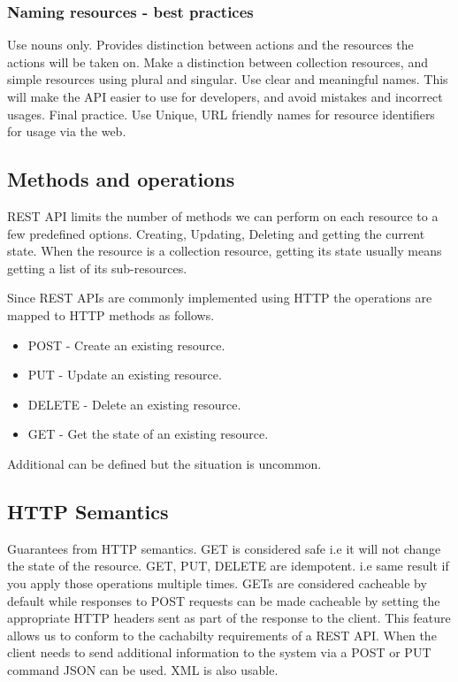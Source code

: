 \subsubsection{Naming resources - best practices}
Use nouns only.
Provides distinction between actions and the resources the actions will be taken on.
Make a distinction between collection resources, and simple resources using plural and singular.
Use clear and meaningful names.
This will make the API easier to use for developers, and avoid mistakes and incorrect usages.
Final practice.
Use Unique, URL friendly names for resource identifiers for usage via the web.

\subsection{Methods and operations}
REST API limits the number of methods we can perform on each resource to a few predefined options.
Creating, Updating, Deleting and getting the current state.
When the resource is a collection resource, getting its state usually means getting a list of its sub-resources.

Since REST APIs are commonly implemented using HTTP the operations are mapped to HTTP methods as follows.

\begin{itemize}
    \item POST - Create an existing resource.
    \item PUT - Update an existing resource.
    \item DELETE - Delete an existing resource.
    \item GET - Get the state of an existing resource.
\end{itemize}

Additional can be defined but the situation is uncommon.

\subsection{HTTP Semantics}
Guarantees from HTTP semantics.
GET is considered safe i.e it will not change the state of the resource.
GET, PUT, DELETE are idempotent.
i.e same result if you apply those operations multiple times.
GETs are considered cacheable by default while responses to POST requests can be made cacheable by setting the appropriate HTTP headers sent as part of the response to the client.
This feature allows us to conform to the cachabilty requirements of a REST API.
When the client needs to send additional information to the system via a POST or PUT command JSON can be used.
XML is also usable.

